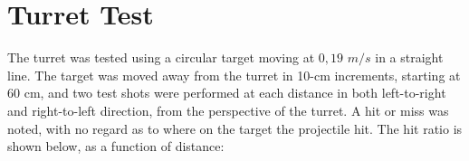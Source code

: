 \section{Turret Test}
The turret was tested using a circular target moving at $0,19$ $m/s$ in a straight line. 
The target was moved away from the turret in 10-cm increments, starting at 60 cm, and two test shots were performed at each distance in both left-to-right and right-to-left direction, from the perspective of the turret. A hit or miss was noted, with no regard as to where on the target the projectile hit. The hit ratio is shown below, as a function of distance:

